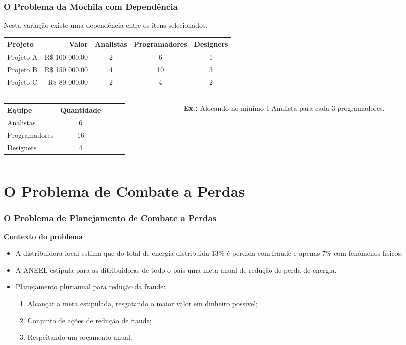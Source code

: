 \documentclass[10pt,fleqn]{beamer}
\newcommand{\litem}[1]{
  \item{#1 \vspace{9pt}}
}
\newcommand{\chamada}[1]{
  \textcolor{ninfagreen}{\textbf{#1}}
  \vspace{10pt}
}
\begin{document}
\begin{frame}
  \frametitle{O Problema da Mochila com Dependência}
  Nesta variação existe uma dependência entre os itens selecionados. \\
  \vfill
  \begin{tabular}{|l|r|c|c|c|} \hline
    {\bf Projeto} & {\bf Valor} & {\bf Analistas} & {\bf Programadores} & {\bf Designers} \\ \hline
	Projeto A & R\$ 100 000,00 & 2 & 6 & 1 \\ \hline
	Projeto B & R\$ 150 000,00 & 4 & 10 & 3 \\ \hline
	Projeto C & R\$ 80 000,00 & 2 & 4 & 2 \\ \hline
  \end{tabular}
  \vfill
  \begin{columns}[T]
    \begin{column}{.5\textwidth}
      \begin{tabular}{|l|c|c|c|c|} \hline
        {\bf Equipe} & {\bf Quantidade} \\ \hline
	    Analistas & 6 \\ \hline
	    Programadores & 16 \\ \hline
	    Designers & 4 \\ \hline
      \end{tabular}
	\end{column}
    \begin{column}{.5\textwidth}
	  \chamada{Ex.:} Alocando no mínimo $1$ Analista para cada $3$ programadores.
	\end{column}
  \end{columns}
\end{frame}

\section{O Problema de Combate a Perdas}

\begin{frame}
  \frametitle{O Problema de Planejamento de Combate a Perdas}
  \chamada{Contexto do problema}
  \begin{itemize}
  	\litem{A distribuidora local estima que do total de energia distribuida
	  $13\%$ é perdida com fraude e apenas $7\%$ com fenômenos físicos.}
  	\litem{A ANEEL estipula para as ditribuidoras de todo o país uma meta anual de
  	  redução de perda de energia.}
    \litem {Planejamento plurianual para redução da fraude:}
	\begin{enumerate}
	  \item{Alcançar a meta estipulada, resgatando o maior valor em dinheiro possível;}
	  \item{Conjunto de ações de redução de fraude;}
	  \item{Respeitando um orçamento anual;}
	\end{enumerate}
  \end{itemize}
\end{frame}
\end{document}
